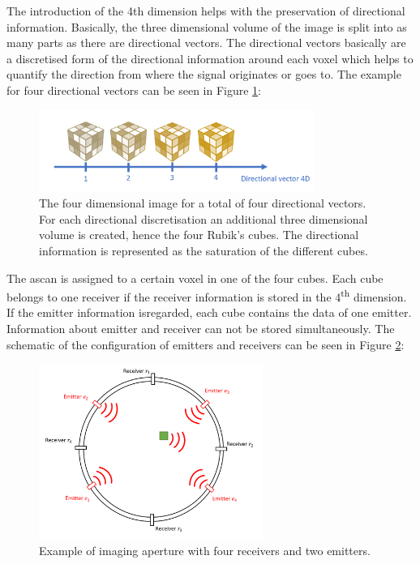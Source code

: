 The introduction of the 4th dimension helps with the preservation of directional information. Basically, the three dimensional volume of the image is split into as many parts as there are directional vectors. The directional vectors basically are a discretised form of the directional information around each voxel which helps to quantify the direction from where the signal originates or goes to. The example for four directional vectors can be seen in Figure \ref{4D_rubics}:

\begin{figure}[H]
    \centering
    \includegraphics[width=0.80\textwidth]{Graphics/rubicscube4D.png}
    \caption{The four dimensional image for a total of four directional vectors. For each directional discretisation an additional three dimensional volume is created, hence the four Rubik's cubes. The directional information is represented as the saturation of the different cubes.}
    \label{4D_rubics}
\end{figure}

The \ac{ascan} is assigned to a certain voxel in one of the four cubes. Each cube belongs to one receiver if the receiver information is stored in the 4\textsuperscript{th} dimension. If the emitter information isregarded, each cube contains the data of one emitter. Information about emitter and receiver can not be stored simultaneously. The schematic of the configuration of emitters and receivers can be seen in Figure \ref{4D_problem}:

\begin{figure}[H]
    \centering
    \includegraphics[width=0.65\textwidth]{Graphics/problem_4D.png}
    \caption{Example of imaging aperture with four receivers and two emitters.}
    \label{4D_problem}
\end{figure}

